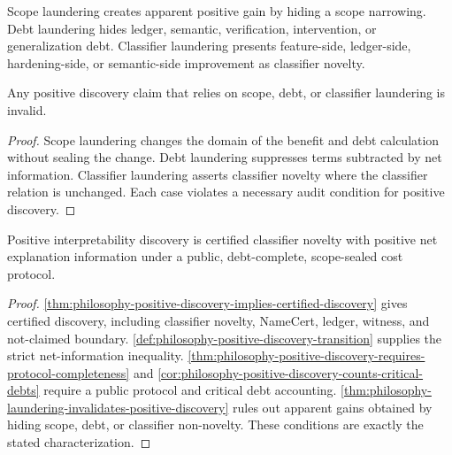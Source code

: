 \begin{definition}
\label{def:philosophy-discovery-laundering}
Scope laundering creates apparent positive gain by hiding a scope
narrowing. Debt laundering hides ledger, semantic, verification,
intervention, or generalization debt. Classifier laundering presents
feature-side, ledger-side, hardening-side, or semantic-side improvement
as classifier novelty.
\end{definition}

\begin{theorem}
\label{thm:philosophy-laundering-invalidates-positive-discovery}
Any positive discovery claim that relies on scope, debt, or classifier
laundering is invalid.
\end{theorem}
\begin{proof}
Scope laundering changes the domain of the benefit and debt calculation
without sealing the change. Debt laundering suppresses terms subtracted
by net information. Classifier laundering asserts classifier novelty
where the classifier relation is unchanged. Each case violates a
necessary audit condition for positive discovery.
\end{proof}

\begin{theorem}
\label{thm:philosophy-positive-interpretability-discovery-theorem}
Positive interpretability discovery is certified classifier novelty with
positive net explanation information under a public, debt-complete,
scope-sealed cost protocol.
\end{theorem}
\begin{proof}
\autoref{thm:philosophy-positive-discovery-implies-certified-discovery}
gives certified discovery, including classifier novelty, NameCert,
ledger, witness, and not-claimed boundary.
\autoref{def:philosophy-positive-discovery-transition} supplies the
strict net-information inequality.
\autoref{thm:philosophy-positive-discovery-requires-protocol-completeness}
and \autoref{cor:philosophy-positive-discovery-counts-critical-debts}
require a public protocol and critical debt accounting.
\autoref{thm:philosophy-laundering-invalidates-positive-discovery}
rules out apparent gains obtained by hiding scope, debt, or classifier
non-novelty. These conditions are exactly the stated characterization.
\end{proof}
